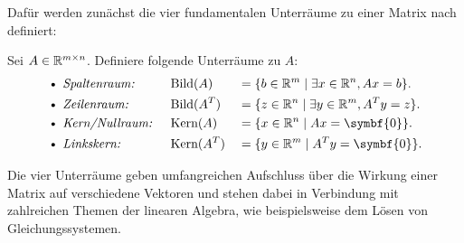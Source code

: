 Dafür werden zunächst die vier fundamentalen Unterräume zu einer Matrix nach~\cite[185]{strangLineareAlgebra2003} definiert:
\begin{definition}\label{df:four}
    Sei \(A \in \mathbb{R}^{m \times n}\). Definiere folgende Unterräume zu \(A\): 
    \begin{alignat*}{3}
        \text{\textbullet } &\textit{ Spaltenraum: } 
        &&\text{Bild}(A) &{}={}& \{ b \in \R^m \mid \exists x \in \R^n, Ax = b \}. \\
        \text{\textbullet } &\textit{ Zeilenraum: }
        &&\text{Bild}(A^{T}) &{}={}& \{ z \in \R^n \mid \exists y \in \R^m, A^{T}y = z \}.\\
        \text{\textbullet } &\textit{ Kern/Nullraum: }
        &&\text{Kern}(A) &{}={}& \{ x \in \R^n \mid Ax = \symbf{0} \}.\\
        \text{\textbullet } &\textit{ Linkskern: }
        &&\text{Kern}(A^{T}) &{}={}& \{ y \in \R^m \mid A^{T}y = \symbf{0} \}.
    \end{alignat*}
\end{definition}
Die vier Unterräume geben umfangreichen Aufschluss über die Wirkung einer Matrix auf verschiedene Vektoren und stehen dabei in Verbindung mit zahlreichen Themen der linearen Algebra, wie beispielsweise dem Lösen von Gleichungssystemen.

